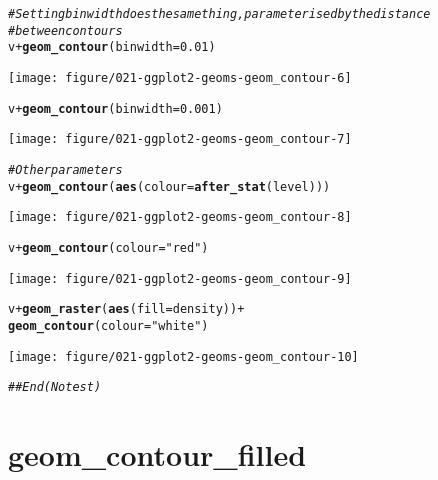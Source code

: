 \documentclass[a4paper,titlepage]{tufte-handout}\usepackage[]{graphicx}\usepackage[]{xcolor}
\makeatletter
\def\maxwidth{ %
  \ifdim\Gin@nat@width>\linewidth
    \linewidth
  \else
    \Gin@nat@width
  \fi
}
\newcommand{\hlnum}[1]{\textcolor[rgb]{0.686,0.059,0.569}{#1}}%
\newcommand{\hlsng}[1]{\textcolor[rgb]{0.192,0.494,0.8}{#1}}%
\newcommand{\hlcom}[1]{\textcolor[rgb]{0.678,0.584,0.686}{\textit{#1}}}%
\newcommand{\hlopt}[1]{\textcolor[rgb]{0,0,0}{#1}}%
\newcommand{\hldef}[1]{\textcolor[rgb]{0.345,0.345,0.345}{#1}}%
\newcommand{\hlkwc}[1]{\textcolor[rgb]{0.333,0.667,0.333}{#1}}%
\newcommand{\hlkwd}[1]{\textcolor[rgb]{0.737,0.353,0.396}{\textbf{#1}}}%
\newenvironment{kframe}{%
 \def\at@end@of@kframe{}%
 \ifinner\ifhmode%
  \def\at@end@of@kframe{\end{minipage}}%
  \begin{minipage}{\columnwidth}%
 \fi\fi%
 \def\FrameCommand##1{\hskip\@totalleftmargin \hskip-\fboxsep
 \colorbox{shadecolor}{##1}\hskip-\fboxsep
     \hskip-\linewidth \hskip-\@totalleftmargin \hskip\columnwidth}%
 \MakeFramed {\advance\hsize-\width
   \@totalleftmargin\z@ \linewidth\hsize
   \@setminipage}}%
 {\par\unskip\endMakeFramed%
 \at@end@of@kframe}
\newenvironment{knitrout}{}{} %
\makeatother
\begin{document}
\begin{knitrout}
\begin{kframe}\begin{alltt}
\hlcom{# Setting binwidth does the same thing, parameterised by the distance}
\hlcom{# between contours}
\hldef{v} \hlopt{+} \hlkwd{geom_contour}\hldef{(}\hlkwc{binwidth} \hldef{=} \hlnum{0.01}\hldef{)}
\end{alltt}
\end{kframe}
\texttt{[image: figure/021-ggplot2-geoms-geom\_contour-6]} 
\begin{kframe}\begin{alltt}
\hldef{v} \hlopt{+} \hlkwd{geom_contour}\hldef{(}\hlkwc{binwidth} \hldef{=} \hlnum{0.001}\hldef{)}
\end{alltt}
\end{kframe}
\texttt{[image: figure/021-ggplot2-geoms-geom\_contour-7]} 
\begin{kframe}\begin{alltt}
\hlcom{# Other parameters}
\hldef{v} \hlopt{+} \hlkwd{geom_contour}\hldef{(}\hlkwd{aes}\hldef{(}\hlkwc{colour} \hldef{=} \hlkwd{after_stat}\hldef{(level)))}
\end{alltt}
\end{kframe}
\texttt{[image: figure/021-ggplot2-geoms-geom\_contour-8]} 
\begin{kframe}\begin{alltt}
\hldef{v} \hlopt{+} \hlkwd{geom_contour}\hldef{(}\hlkwc{colour} \hldef{=} \hlsng{"red"}\hldef{)}
\end{alltt}
\end{kframe}
\texttt{[image: figure/021-ggplot2-geoms-geom\_contour-9]} 
\begin{kframe}\begin{alltt}
\hldef{v} \hlopt{+} \hlkwd{geom_raster}\hldef{(}\hlkwd{aes}\hldef{(}\hlkwc{fill} \hldef{= density))} \hlopt{+}
  \hlkwd{geom_contour}\hldef{(}\hlkwc{colour} \hldef{=} \hlsng{"white"}\hldef{)}
\end{alltt}
\end{kframe}
\texttt{[image: figure/021-ggplot2-geoms-geom\_contour-10]} 
\begin{kframe}\begin{alltt}
\hlcom{## End(No test)}
\end{alltt}
\end{kframe}
\end{knitrout}


\section{geom\_contour\_filled}
\end{document}
